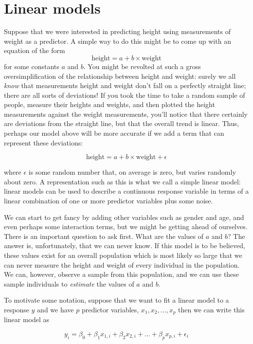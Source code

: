 

\chapter{Linear models}
\label{ch:linear}


Suppose that we were interested in predicting height using measurements of weight as a predictor. A simple way to do this might be to come up with an equation of the form
$$\text{height} = a + b \times \text{weight}$$
for some constants $a$ and $b$. You might be revolted at such a gross oversimplification of the relationship between height and weight: surely we all \emph{know} that measurements height and weight don't fall on a perfectly straight line; there are all sorts of deviations! If you took the time to take a random sample of people, measure their heights and weights, and then plotted the height measurements against the weight measurements, you'll notice that there certainly are deviations from the straight line, but that the overall trend is linear. Thus, perhaps our model above will be more accurate if we add a term that can represent these deviations:

$$\text{height} = a + b \times \text{weight} + \epsilon$$

where $\epsilon$ is some random number that, on average is zero, but varies randomly about zero. A representation such as this is what we call a simple linear model: linear models can be used to describe a continuous response variable in terms of a linear combination of one or more predictor variables plus some noise. 

We can start to get fancy by adding other variables such as gender and age, and even perhaps some interaction terms, but we might be getting ahead of ourselves. There is an important question to ask first. What are the values of $a$ and $b$? The answer is, unfortunately, that we can never know. If this model is to be believed, these values exist for an overall population which is most likely so large that we can never measure the height and weight of every individual in the population. We can, however, observe a sample from this population, and we can use these sample individuals to \emph{estimate} the values of $a$ and $b$.

To motivate some notation, suppose that we want to fit a linear model to a response $y$ and we have $p$ predictor variables, $x_1, x_2,..., x_p$ then we can write this linear model as

$$y_i = \beta_0 + \beta_1x_{1,i} + \beta_2 x_{2,i} + ... + \beta_px_{p,i} + \epsilon_i$$

